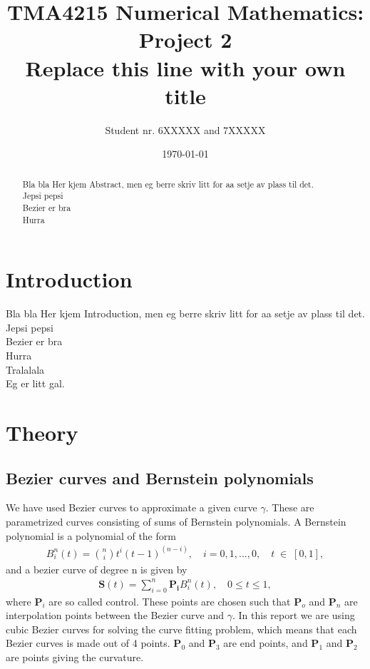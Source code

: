 \documentclass[10pt]{article}
\title{TMA4215 Numerical Mathematics: Project 2 \\ Replace this line with your own title}
\author{Student nr. 6XXXXX and 7XXXXX} %
\date{\today}
\begin{document}
\maketitle
\begin{abstract}

Bla bla Her kjem Abstract, men eg berre skriv litt for aa setje av plass til det. \\
Jepsi pepsi \\
Bezier er bra \\
Hurra \\

\end{abstract}

\section{Introduction} 

Bla bla Her kjem Introduction, men eg berre skriv litt for aa setje av plass til det. \\
Jepsi pepsi \\
Bezier er bra \\
Hurra \\
Tralalala \\
Eg er litt gal. \\

\section{Theory}



\subsection*{Bezier curves and Bernstein polynomials}

We have used Bezier curves to approximate a given curve $\gamma$. These are parametrized curves consisting of sums of Bernstein polynomials. A Bernstein polynomial is a polynomial of the form
\begin{align}
B_{i}^n(t) = \binom{n}{i}t^i(t-1)^{(n-i)},\quad i = 0, 1, ..., 0,\quad t \; \in \; [0,1],
\end{align}
and a bezier curve of degree n is given by
\begin{align}
\mathbf{S}(t) = \sum_{i=0}^{n} \mathbf{P_i} B_{i}^n(t), \quad 0 \leq t \leq 1,
\end{align}
where $\mathbf{P}_i$ are so called control. These points are chosen such that $\mathbf{P}_o$ and $\mathbf{P}_n$ are interpolation points between the Bezier curve and $\gamma$. In this report we are using cubic Bezier curves for solving the curve fitting problem, which means that each Bezier curves is made out of 4 points. $\mathbf{P}_0$ and $\mathbf{P}_3$ are end points, and $\mathbf{P}_1$ and $\mathbf{P}_2$ are points giving the curvature.
\end{document}
